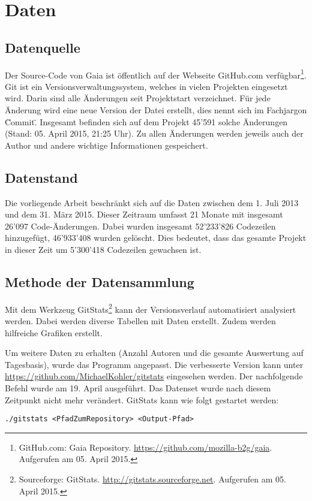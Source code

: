 \chapter{Daten}

\section{Datenquelle}
Der Source-Code von Gaia ist öffentlich auf der Webseite GitHub.com verfügbar\footnote{GitHub.com: Gaia Repository. \url{https://github.com/mozilla-b2g/gaia}. Aufgerufen am 05. April 2015.}. Git ist ein Versionsverwaltungssystem, welches in vielen Projekten eingesetzt wird. Darin sind alle Änderungen seit Projektstart verzeichnet. Für jede Änderung wird eine neue Version der Datei erstellt, dies nennt sich im Fachjargon \"Commit\". Insgesamt befinden sich auf dem Projekt 45'591 solche Änderungen (Stand: 05. April 2015, 21:25 Uhr). Zu allen Änderungen werden jeweils auch der Author und andere wichtige Informationen gespeichert.

\section{Datenstand}
Die vorliegende Arbeit beschränkt sich auf die Daten zwischen dem 1. Juli 2013 und dem 31. März 2015. Dieser Zeitraum umfasst 21 Monate mit insgesamt 26'097 Code-Änderungen. Dabei wurden insgesamt 52'233'826 Codezeilen hinzugefügt, 46'933'408 wurden gelöscht. Dies bedeutet, dass das gesamte Projekt in dieser Zeit um 5'300'418 Codezeilen gewachsen ist.

\section{Methode der Datensammlung}
Mit dem Werkzeug GitStats\footnote{Sourceforge: GitStats. \url{http://gitstats.sourceforge.net}. Aufgerufen am 05. April 2015.} kann der Versionsverlauf automatisiert analysiert werden. Dabei werden diverse Tabellen mit Daten erstellt. Zudem werden hilfreiche Grafiken erstellt.

Um weitere Daten zu erhalten (Anzahl Autoren und die gesamte Auswertung auf Tagesbasis), wurde das Programm angepasst. Die verbesserte Version kann unter \url{https://github.com/MichaelKohler/gitstats} eingesehen werden. Der nachfolgende Befehl wurde am 19. April ausgeführt. Das Datenset wurde nach diesem Zeitpunkt nicht mehr verändert. GitStats kann wie folgt gestartet werden:

\begin{lstlisting}
./gitstats <PfadZumRepository> <Output-Pfad>
\end{lstlisting}

